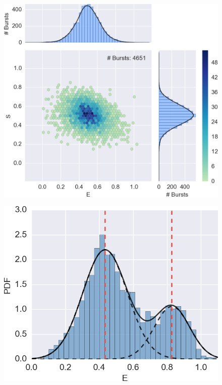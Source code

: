 \begin{figure}
\begin{center}
\includegraphics[width=\singlefig]{"figures/alex_jointplot_fretsel/alex_jointplot_fretsel"}
\caption[]{}
\end{center}
\end{figure}



\begin{figure}
\begin{center}
\includegraphics[width=0.8\singlefig]{"figures/hist_fit/hist_fit"}
\caption[]{}
\end{center}
\end{figure}


